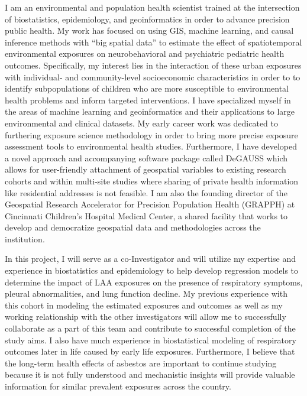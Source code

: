 \documentclass{nihbiosketch}
\begin{document}
\begin{statement}
I am an environmental and population health scientist trained at the
intersection of biostatistics, epidemiology, and geoinformatics in order to
advance precision public health. My work has focused on using
GIS, machine learning, and causal inference methods with ``big spatial data'' to
estimate the effect of spatiotemporal environmental exposures on neurobehavioral and
psychiatric pediatric health
outcomes. Specifically, my interest lies in the
interaction of these urban exposures with individual- and community-level
socioeconomic characteristics in order to to identify subpopulations of children
who are more susceptible to environmental health problems and inform targeted
interventions. I have specialized myself in the areas of machine learning and geoinformatics and their applications to large environmental and
clinical datasets. My early career work was dedicated to furthering exposure science methodology in
order to bring more precise exposure assessment tools to environmental health
studies. Furthermore, I have developed a novel approach and
accompanying software package called DeGAUSS which allows for user-friendly
attachment of geospatial variables to existing research cohorts and within
multi-site studies where sharing of private health information like residential
addresses is not feasible. I am also the founding director of the Geospatial Research Accelerator for Precision Population Health (GRAPPH) at Cincinnati Children's Hospital Medical Center, a shared facility that works to develop and democratize geospatial data and methodologies across the institution.

In this project, I will serve as a co-Investigator and will utilize my
expertise and experience in biostatistics and epidemiology to help develop
regression models to determine the impact of LAA exposures on the presence of
respiratory symptoms, pleural abnormalities, and lung function decline. My previous
experience with this cohort in modeling the estimated exposures and outcomes as well
as my working relationship with the other investigators will allow me to
successfully collaborate as a part of this team and contribute to successful
completion of the study aims. I also have much experience in biostatistical
modeling of respiratory outcomes later in life caused by early life exposures. Furthermore, I believe that the long-term health
effects of asbestos are important to continue studying because it is not fully
understood and mechanistic insights will provide valuable information for
similar prevalent exposures across the country.\\


\end{statement}
\end{document}
